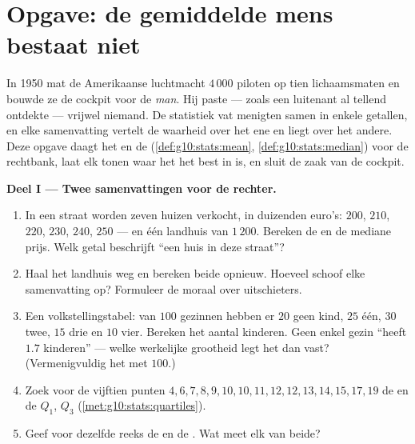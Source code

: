 \section{Opgave: de gemiddelde mens bestaat niet}

\begin{problem}
\label{pb:g10:stats:1}
In 1950 mat de Amerikaanse luchtmacht $4\,000$ piloten op tien
lichaamsmaten en bouwde ze de cockpit voor de \emph{ man}. Hij
paste --- zoals een luitenant al tellend ontdekte --- vrijwel niemand. De
statistiek vat menigten samen in enkele getallen, en elke samenvatting
vertelt de waarheid over het ene en liegt over het andere. Deze opgave
daagt het  en de  (\cref{def:g10:stats:mean},
\cref{def:g10:stats:median}) voor de rechtbank, laat elk tonen waar het het
best in is, en sluit de zaak van de cockpit.

\medskip
\noindent\textbf{Deel I --- Twee samenvattingen voor de rechter.}
\begin{enumerate}
  \item In een straat worden zeven huizen verkocht, in duizenden euro's:
        $200$, $210$, $220$, $230$, $240$, $250$ --- en één landhuis van
        $1\,200$. Bereken de  en de mediane prijs. Welk getal
        beschrijft ``een huis in deze straat''?
  \item Haal het landhuis weg en bereken beide opnieuw. Hoeveel schoof elke
        samenvatting op? Formuleer de moraal over uitschieters.
  \item Een volkstellingstabel: van $100$ gezinnen hebben er $20$ geen kind,
        $25$ één, $30$ twee, $15$ drie en $10$ vier. Bereken het 
        aantal kinderen. Geen enkel gezin ``heeft $1.7$ kinderen'' --- welke
        werkelijke grootheid legt het  dan vast? (Vermenigvuldig het
        met $100$.)
  \item Zoek voor de vijftien punten
        $4, 6, 7, 8, 9, 10, 10, 11, 12, 12, 13, 14, 15, 17, 19$ de  en
        de  $Q_1$, $Q_3$ (\cref{met:g10:stats:quartiles}).
  \item Geef voor dezelfde reeks de  en de
        . Wat meet elk van beide?
\end{enumerate}


\end{problem}
